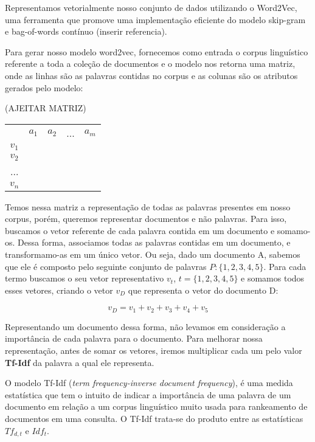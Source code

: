 \documentclass[a4paper,12pt]{article}
\begin{document}
Representamos vetorialmente nosso conjunto de dados utilizando o Word2Vec, uma ferramenta que promove uma implementação eficiente do
modelo skip-gram e bag-of-words contínuo (inserir referencia).

Para gerar nosso modelo word2vec, fornecemos como entrada o corpus linguístico referente a toda a coleção de documentos
e o modelo nos retorna uma matriz, onde as linhas são as palavras contidas no corpus e as colunas são os atributos gerados pelo modelo:

(AJEITAR MATRIZ)

\begin{center}
 \begin{tabular}{ccccc}
          & $a_{1}$ & $a_{2}$ & ... & $a_{m}$ \\ \cline{2-5}
    $v_{1}$ &    &    &     &    \\
    $v_{2}$ &    &    &     &    \\
    ...  &    &    &     &    \\
    $v_{n}$ &    &    &     &    \\
    \end{tabular}
 
\end{center}


Temos nessa matriz a representação de todas as palavras presentes em nosso corpus, porém, queremos representar documentos e não palavras.
Para isso, buscamos o vetor referente de cada palavra contida em um documento e somamo-os. Dessa forma, associamos todas as palavras contidas
em um documento, e transformamo-as em um único vetor. Ou seja, dado um documento A, sabemos que ele é composto pelo seguinte conjunto de palavras
$P:\{1,2,3,4,5\}$. Para cada termo buscamos o seu vetor representativo $v_{t}$, $t =\{1,2,3,4,5\}$ e somamos todos esses vetores, criando o vetor
$v_{D}$ que representa o vetor do documento D:

$$v_{D} = v_{1}+v_{2}+v_{3}+v_{4}+v_{5} $$

Representando um documento dessa forma, não levamos em consideração a importância de cada palavra para o documento. Para melhorar nossa 
representação, antes de somar os vetores, iremos multiplicar cada um pelo valor \textbf{Tf-Idf} da palavra a qual ele representa.

O modelo Tf-Idf (\textit{term frequency-inverse document frequency}), é uma medida estatística que tem o intuito de indicar
a importância de uma palavra de um documento em relação a um corpus linguístico muito usada para rankeamento de documentos em uma consulta. O Tf-Idf trata-se do produto entre as estatísticas $Tf_{d,t}$ e
$Idf_{t}$.
\end{document}
